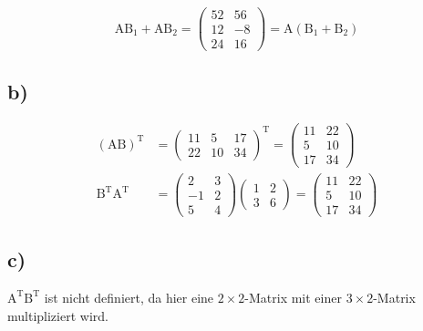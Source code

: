 \documentclass[a4paper]{scrartcl}
\begin{document}
		\[\text{AB}_1+\text{AB}_2=\begin{pmatrix}
			52&56 \\ 12&-8 \\ 24&16
		\end{pmatrix}=\text{A}(\text{B}_1+\text{B}_2)\]


	\subsection{b)}
		\begin{align}
			(\text{AB})^\text{T}&=\begin{pmatrix}
				11&5&17 \\
				22&10&34
			\end{pmatrix}^\text{T}
			=\begin{pmatrix}
				11&22\\5&10\\17&34
			\end{pmatrix}\\
			\text{B}^\text{T}\text{A}^\text{T}&=\begin{pmatrix}
				2&3\\-1&2\\5&4
			\end{pmatrix}\begin{pmatrix}
				1&2\\3&6
			\end{pmatrix}=\begin{pmatrix}
				11&22\\5&10\\17&34
			\end{pmatrix}
		\end{align}
		
	\subsection{c)}
		\(\text{A}^\text{T}\text{B}^\text{T}\) ist nicht definiert, da hier eine \(2\times 2\)-Matrix mit 
		einer \(3\times 2\)-Matrix multipliziert wird.
		
		
\end{document}
